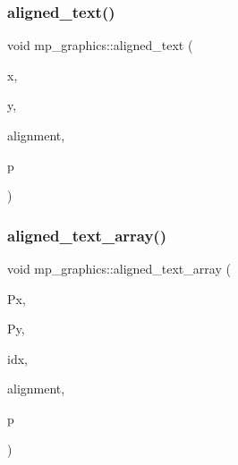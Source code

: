 \subsubsection{\texorpdfstring{aligned\+\_\+text()}{aligned\_text()}}
{\footnotesize\ttfamily void mp\+\_\+graphics\+::aligned\+\_\+text (\begin{DoxyParamCaption}\item[{\mbox{\hyperlink{galois_8h_a09fddde158a3a20bd2dcadb609de11dc}{I\+NT}}}]{x,  }\item[{\mbox{\hyperlink{galois_8h_a09fddde158a3a20bd2dcadb609de11dc}{I\+NT}}}]{y,  }\item[{const char $\ast$}]{alignment,  }\item[{const char $\ast$}]{p }\end{DoxyParamCaption})}

\mbox{\label{classmp__graphics_a19f2bd68d1090f43bb7b6567ad81b6b4}} 
\subsubsection{\texorpdfstring{aligned\+\_\+text\+\_\+array()}{aligned\_text\_array()}}
{\footnotesize\ttfamily void mp\+\_\+graphics\+::aligned\+\_\+text\+\_\+array (\begin{DoxyParamCaption}\item[{\mbox{\hyperlink{galois_8h_a09fddde158a3a20bd2dcadb609de11dc}{I\+NT}} $\ast$}]{Px,  }\item[{\mbox{\hyperlink{galois_8h_a09fddde158a3a20bd2dcadb609de11dc}{I\+NT}} $\ast$}]{Py,  }\item[{\mbox{\hyperlink{galois_8h_a09fddde158a3a20bd2dcadb609de11dc}{I\+NT}}}]{idx,  }\item[{const char $\ast$}]{alignment,  }\item[{const char $\ast$}]{p }\end{DoxyParamCaption})}

\mbox{\label{classmp__graphics_a3b5a8558ee721bd8b9ed36e732317679}} 
